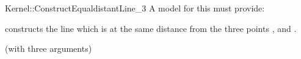 \begin{ccRefFunctionObjectConcept}{Kernel::ConstructEqualdistantLine_3}
A model for this must provide:


{constructs the line which is at the same distance from the three points
,  and .
}

\ccRefines
{} (with three arguments)

\ccSeeAlso
{}

\end{ccRefFunctionObjectConcept}

